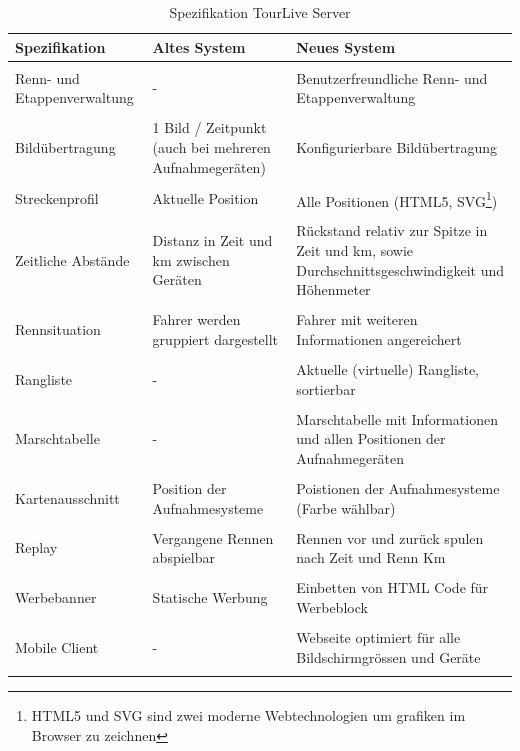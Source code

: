 \begin{longtable}{ p{3.5cm} | p{4.3cm} | p{4.3cm} }
	\textbf{Spezifikation} & \textbf{Altes System} & \textbf{Neues System} \\ [1ex] \hline \hline & & \\ [-1.5ex] Renn- und Etappenverwaltung & - & Benutzerfreundliche Renn- und Etappenverwaltung\\ [1ex] \hline & &  \\ [-1.5ex]
Bildübertragung & 1 Bild / Zeitpunkt (auch bei mehreren Aufnahmegeräten) & Konfigurierbare Bildübertragung\\ [1ex] \hline & &  \\ [-1.5ex]
Streckenprofil & Aktuelle Position & Alle Positionen (HTML5, SVG\footnote{HTML5 und SVG sind zwei moderne Webtechnologien um grafiken im Browser zu zeichnen})\\ [1ex] \hline & &  \\ [-1.5ex]
Zeitliche Abstände & Distanz in Zeit und km zwischen Geräten & Rückstand relativ zur Spitze in Zeit und km, sowie Durchschnittsgeschwindigkeit und Höhenmeter\\ [1ex] \hline & &  \\ [-1.5ex]
Rennsituation & Fahrer werden gruppiert dargestellt & Fahrer mit weiteren Informationen angereichert\\ [1ex] \hline & &  \\ [-1.5ex]
Rangliste & - & Aktuelle (virtuelle) Rangliste, sortierbar\\ [1ex] \hline & &  \\ [-1.5ex]
Marschtabelle & - & Marschtabelle mit Informationen und allen Positionen der Aufnahmegeräten\\ [1ex] \hline & &  \\ [-1.5ex]
Kartenausschnitt & Position der Aufnahmesysteme & Poistionen der Aufnahmesysteme (Farbe wählbar)\\ [1ex] \hline & &  \\ [-1.5ex]
Replay & Vergangene Rennen abspielbar & Rennen vor und zurück spulen nach Zeit und Renn Km\\ [1ex] \hline & &  \\ [-1.5ex]
Werbebanner & Statische Werbung & Einbetten von HTML Code für Werbeblock\\ [1ex] \hline & &  \\ [-1.5ex]
Mobile Client & - & Webseite optimiert für alle Bildschirmgrössen und Geräte\\ [1ex]  

\caption{Spezifikation TourLive Server}
\label{tab:tourlivewebspeztable}
\end{longtable}

